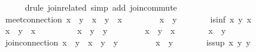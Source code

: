 \begin{isabellebody}
\ \ \ \ \isamarkupfalse%
\ {\isacharparenleft}drule\ join{\isacharunderscore}related{\isacharparenright}\ {\isacharparenleft}simp\ add{\isacharcolon}\ join{\isacharunderscore}commute{\isacharparenright}\isanewline
\isanewline
\ \ \isamarkupfalse%
\ meet{\isacharunderscore}connection{\isacharcolon}\ {\isachardoublequoteopen}{\isacharparenleft}x\ {\isasymsqsubseteq}\ y{\isacharparenright}\ {\isacharequal}\ {\isacharparenleft}x\ {\isasymsqinter}\ y\ {\isacharequal}\ x{\isacharparenright}{\isachardoublequoteclose}\isanewline
\ \ \isamarkupfalse%
\isanewline
\ \ \ \ \isamarkupfalse%
\ {\isachardoublequoteopen}x\ {\isasymsqsubseteq}\ y{\isachardoublequoteclose}\isanewline
\ \ \ \ \isamarkupfalse%
\ \isamarkupfalse%
\ {\isachardoublequoteopen}is{\isacharunderscore}inf\ x\ y\ x{\isachardoublequoteclose}\ \isacommand{{\isachardot}{\isachardot}}\isamarkupfalse%
\isanewline
\ \ \ \ \isamarkupfalse%
\ \isamarkupfalse%
\ {\isachardoublequoteopen}x\ {\isasymsqinter}\ y\ {\isacharequal}\ x{\isachardoublequoteclose}\ \isacommand{{\isachardot}{\isachardot}}\isamarkupfalse%
\isanewline
\ \ \isamarkupfalse%
\isanewline
\ \ \ \ \isamarkupfalse%
\ {\isachardoublequoteopen}x\ {\isasymsqinter}\ y\ {\isasymsqsubseteq}\ y{\isachardoublequoteclose}\ \isacommand{{\isachardot}{\isachardot}}\isamarkupfalse%
\isanewline
\ \ \ \ \isamarkupfalse%
\ \isamarkupfalse%
\ {\isachardoublequoteopen}x\ {\isasymsqinter}\ y\ {\isacharequal}\ x{\isachardoublequoteclose}\isanewline
\ \ \ \ \isamarkupfalse%
\ \isamarkupfalse%
\ {\isachardoublequoteopen}x\ {\isasymsqsubseteq}\ y{\isachardoublequoteclose}\ \isacommand{{\isachardot}}\isamarkupfalse%
\isanewline
\ \ \isamarkupfalse%
\isanewline
\isanewline
\ \ \isamarkupfalse%
\ join{\isacharunderscore}connection{\isacharcolon}\ {\isachardoublequoteopen}{\isacharparenleft}x\ {\isasymsqsubseteq}\ y{\isacharparenright}\ {\isacharequal}\ {\isacharparenleft}x\ {\isasymsqunion}\ y\ {\isacharequal}\ y{\isacharparenright}{\isachardoublequoteclose}\isanewline
\ \ \isamarkupfalse%
\isanewline
\ \ \ \ \isamarkupfalse%
\ {\isachardoublequoteopen}x\ {\isasymsqsubseteq}\ y{\isachardoublequoteclose}\isanewline
\ \ \ \ \isamarkupfalse%
\ \isamarkupfalse%
\ {\isachardoublequoteopen}is{\isacharunderscore}sup\ x\ y\ y{\isachardoublequoteclose}\ \isacommand{{\isachardot}{\isachardot}}\isamarkupfalse%

\end{isabellebody}
